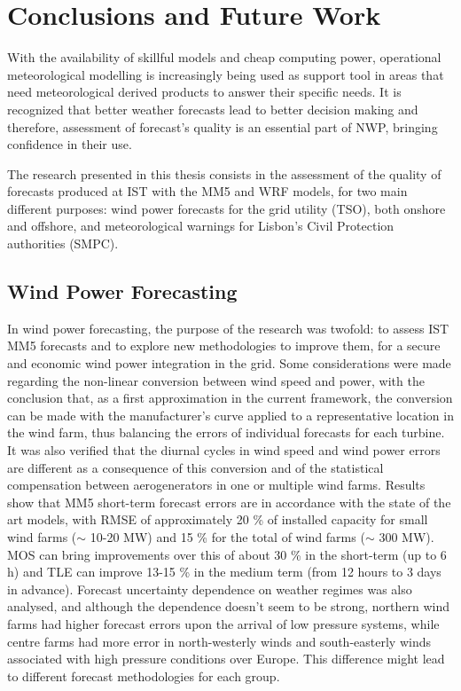 \chapter{Conclusions and Future Work}
\label{sec:conclusions} 

With the availability of skillful models and cheap computing power, operational meteorological modelling is increasingly being used as support tool in areas that need meteorological derived products to answer their specific needs. It is recognized that better weather forecasts lead to better decision making and therefore, assessment of forecast's quality is an essential part of NWP, bringing confidence in their use. 

The research presented in this thesis consists in the assessment of the quality of forecasts produced at IST with the MM5 and WRF models, for two main different purposes: wind power forecasts for the grid utility (TSO), both onshore and offshore, and meteorological warnings for Lisbon's Civil Protection authorities (SMPC).

\section{Wind Power Forecasting}

In wind power forecasting, the purpose of the research was twofold: to assess IST MM5 forecasts and to explore new methodologies to improve them, for a secure and economic wind power integration in the grid. Some considerations were made regarding the non-linear conversion between wind speed and power, with the conclusion that, as a first approximation in the current framework, the conversion can be made with the manufacturer's curve applied to a representative location in the wind farm, thus balancing the errors of individual forecasts for each turbine. It was also verified that the diurnal cycles in wind speed and wind power errors are different as a consequence of this conversion and of the statistical compensation between aerogenerators in one or multiple wind farms. Results show that MM5 short-term forecast errors are in accordance with the state of the art models, with RMSE of approximately 20 \% of installed capacity for small wind farms ($\sim$ 10-20 MW) and 15 \% for the total of wind farms ($\sim$ 300 MW). MOS can bring improvements over this of about 30 \% in the short-term (up to 6 h) and TLE can improve 13-15 \% in the medium term (from 12 hours to 3 days in advance). Forecast uncertainty dependence on weather regimes was also analysed, and although the dependence doesn't seem to be strong, northern wind farms had higher forecast errors upon the arrival of low pressure systems, while centre farms had more error in north-westerly winds and south-easterly winds associated with high pressure conditions over Europe. This difference might lead to different forecast methodologies for each group. 

